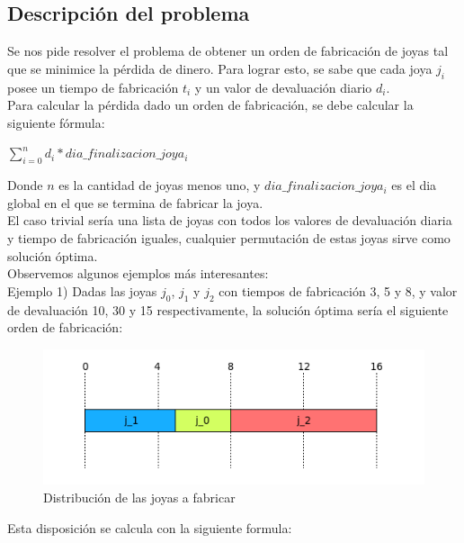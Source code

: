 \subsection{Descripci\'on del problema}

Se nos pide resolver el problema de obtener un orden de fabricaci\'on de joyas tal que se minimice la p\'erdida de dinero. Para lograr esto, se sabe que cada joya $j_{i}$ posee un tiempo de fabricaci\'on $t_{i}$ y un valor de devaluaci\'on diario $d_{i}$. \\

Para calcular la p\'erdida dado un orden de fabricaci\'on, se debe calcular la siguiente f\'ormula:

$\sum\limits_{i=0}^n d_{i}*dia\_finalizacion\_joya_{i}$

Donde $n$ es la cantidad de joyas menos uno, y $dia\_finalizacion\_joya_{i}$ es el dia global en el que se termina de fabricar la joya.\\

El caso trivial ser\'ia una lista de joyas con todos los valores de devaluaci\'on diaria y tiempo de fabricaci\'on iguales, cualquier permutaci\'on de estas joyas sirve como soluci\'on \'optima. \\ 

Observemos algunos ejemplos m\'as interesantes: \\

Ejemplo 1) Dadas las joyas $j_{0}$, $j_{1}$ y $j_{2}$ con tiempos de fabricaci\'on 3, 5 y 8, y valor de devaluaci\'on 10, 30 y 15 respectivamente, la soluci\'on \'optima ser\'ia el siguiente orden de fabricaci\'on:

\begin{figure}[h]
\begin{center}
\includegraphics[scale=0.7]{./img/ej2_chart1.png}
\caption{Distribuci\'on de las joyas a fabricar}
\end{center}
\end{figure}

Esta disposici\'on se calcula con la siguiente formula:

